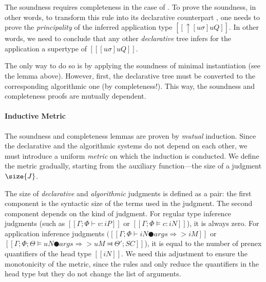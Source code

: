 The soundness requires completeness in the case of
. To prove the soundness, in other words, to
transform this rule into its declarative counterpart
, one needs to prove the \emph{principality} of
the inferred application type $[[↑[uσ]uQ]]$. In other words, we need to conclude
that any other \emph{declarative} tree infers for the application a supertype of
$[[ [uσ]uQ ]]$. 

The only way to do so is by applying the soundness of minimal instantiation
(see the lemma above). However, first, the declarative
tree must be converted to the corresponding algorithmic one (by completeness!).
This way, the soundness and completeness proofs are mutually dependent.

\paragraph{Inductive Metric}
    The soundness and completeness lemmas are proven by \emph{mutual} induction. 
    Since the declarative and the algorithmic systems do not depend on each other,
    we must introduce a uniform \emph{metric} on which the induction is conducted.
    We define the metric gradually, starting from the
    auxiliary function---the size of a judgment $\size{J}$.

    The size of \emph{declarative} and \emph{algorithmic} judgments is defined as
    a pair: the first component is the syntactic size of the terms used in the judgment. 
    The second component depends on the kind of judgment. For regular
    type inference judgments (such as $[[Γ ; Φ ⊢ v : iP]]$
    or $[[Γ ; Φ ⊨ c : iN]]$), it is always zero. For application inference judgments
    $([[Γ ; Φ ⊢ iN ● args ⇒> iM]]$ or $[[Γ ; Φ ; Θ ⊨ uN ● args ⇒> uM ⫤ Θ'; SC]]$), 
    it is equal to the number of prenex quantifiers of the head type $[[iN]]$.
    We need this adjustment to ensure the monotonicity of the metric, since the rules 
     and 
    only reduce the quantifiers in the head type but they do not change the list of arguments.

